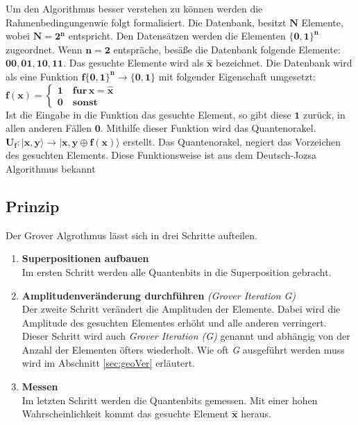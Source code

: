 Um den Algorithmus besser verstehen zu können werden die Rahmenbedingungenwie folgt formalisiert. Die Datenbank, besitzt $\mathbf{N}$ Elemente, wobei  $\mathbf{N = 2^n}$ entspricht. Den Datensätzen werden die Elementen $\mathbf{ \{ 0,1 \}^n}$ zugeordnet. Wenn $\mathbf{ n=2}$ entspräche, besäße die Datenbank folgende Elemente: $\mathbf{00,01,10,11}$. Das gesuchte Elemente wird als $\mathbf{\hat{x}}$ bezeichnet. Die Datenbank wird als eine Funktion $\mathbf{f \{ 0,1 \}^n  \rightarrow \{ 0,1 \}}$ mit folgender Eigenschaft umgesetzt: \\
$\mathbf{f(x) = \begin{cases}1 \quad f\ddot{u}r \,
		x = \hat x \\0 \quad sonst \end{cases} 
}$ 
\newline
\\
Ist die Eingabe in die Funktion das gesuchte Element, so gibt diese $\mathbf{1}$ zurück, in allen anderen Fällen $\mathbf{0}$. 
Mithilfe dieser Funktion wird das Quantenorakel. $\mathbf{U_f : | x,y \rangle \to |x,y \oplus f(x) \rangle}$ erstellt. Das Quantenorakel, negiert das Vorzeichen des gesuchten Elements. Diese Funktionsweise ist aus dem Deutsch-Jozsa Algorithmus bekannt

\subsection{Prinzip}
Der Grover Algrothmus lässt sich in drei Schritte aufteilen.
\begin{enumerate}
	\item \textbf{Superpositionen aufbauen}
	\\
	Im ersten Schritt werden alle Quantenbits in die Superposition gebracht.
	\item \textbf{Amplitudenveränderung durchführen} \emph{(Grover Iteration G)}
	\\
	Der zweite Schritt verändert die Amplituden der Elemente. Dabei wird die Amplitude des gesuchten Elementes erhöht und alle anderen verringert. Dieser Schritt wird auch \emph{Grover Iteration (G)} genannt und abhängig von der Anzahl der Elementen öfters wiederholt. Wie oft \emph{G} ausgeführt werden muss wird im Abschnitt \ref{sec:geoVer} erläutert.
	\item \textbf{Messen} 
	\\
	Im letzten Schritt werden die Quantenbits gemessen. Mit einer hohen Wahrscheinlichkeit kommt das gesuchte Element $\mathbf{\hat x}$ heraus.
\end{enumerate}

